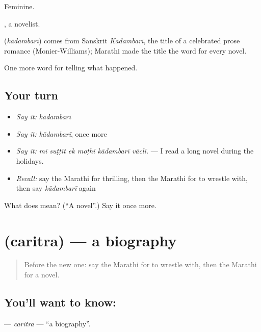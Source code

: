 Feminine.

, a novelist.

\begin{cousinweb}
\textbf{} (\emph{kādambarī}) comes from Sanskrit \emph{Kādambarī}, the title of a celebrated prose romance (Monier-Williams); Marathi made the title the word for every novel.
\end{cousinweb}

\begin{grammarlens}[title={What you've built}]
One more word for telling what happened.
\end{grammarlens}

\subsection*{Your turn}
\begin{itemize}
\raggedright
  \item \emph{Say it:} \emph{kādambarī}
  \item \emph{Say it:} \emph{kādambarī}, once more
  \item \emph{Say it:} \emph{mī suṭṭīt ek moṭhī kādambarī vāclī.} — I read a long novel during the holidays.
  \item \emph{Recall:} say the Marathi for thrilling, then the Marathi for to wrestle with, then say \emph{kādambarī} again
\end{itemize}

\begin{tcolorbox}[breakable,colback=teal!4,colframe=teal!35!black,title={Before you move on}]
What does  mean? (\textquotedblleft{}A novel\textquotedblright{}.) Say it once more.
\end{tcolorbox}
\section[\texorpdfstring{\mr{चरित्र} (caritra)}{चरित्र (caritra)}]{ (caritra) — a biography}

\label{lesson:MR-C341-caritra}



\begin{quote}
Before the new one: say the Marathi for to wrestle with, then the Marathi for a novel.
\end{quote}

\subsection*{You'll want to know: }
\textbf{} — \emph{caritra} — \textquotedblleft{}a biography\textquotedblright{}.


